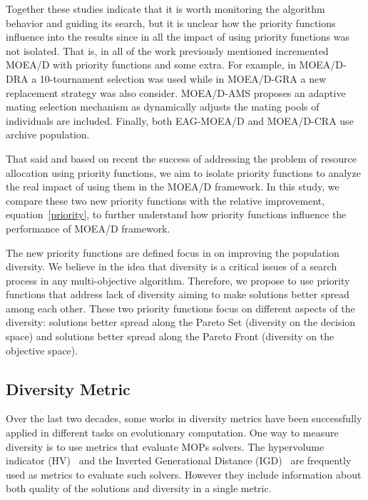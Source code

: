 Together these studies indicate that it is worth monitoring the algorithm behavior and guiding its search, but it is unclear how the priority functions influence into the results since in all the impact of using priority functions was not isolated. That is, in all of the work previously mentioned incremented MOEA/D with priority functions and some extra. For example, in MOEA/D-DRA a 10-tournament selection was used while in MOEA/D-GRA a new replacement strategy was also consider. MOEA/D-AMS proposes an adaptive mating selection mechanism as dynamically adjusts the mating pools of individuals are included. Finally, both EAG-MOEA/D and MOEA/D-CRA use archive population.

That said and based on recent the success of addressing the problem of resource allocation using priority functions, we aim to isolate priority functions to analyze the real impact of using them in the MOEA/D framework. In this study, we compare these two new priority functions with the relative improvement, equation~\ref{priority}, to further understand how priority functions influence the performance of MOEA/D framework.

The new priority functions are defined focus in on improving the population diversity. We believe in the idea that diversity is a critical issues of a search process in any multi-objective algorithm. Therefore, we propose to use priority functions that address lack of diversity aiming to make solutions better spread among each other. These two priority functions focus on different aspects of the diversity: solutions better spread along the Pareto Set (diversity on the decision space) and solutions better spread along the Pareto Front (diversity on the objective space).




\subsection{Diversity Metric}


Over the last two decades, some works in diversity metrics have been successfully applied in different tasks on evolutionary computation. One way to measure diversity is to use metrics that evaluate MOPs solvers. The hypervolume indicator (HV)~\cite{zitzler1998multiobjective} and the Inverted Generational Distance (IGD)~\cite{zhang2008rm} are frequently used as metrics to evaluate such solvers. However they include information about both quality of the solutions and diversity in a single metric.

